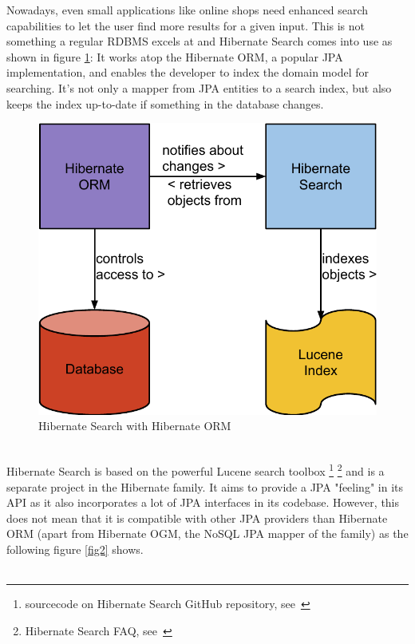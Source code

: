\pagebreak
\noindent
Nowadays, even small applications like online shops need enhanced search capabilities to let the user find more results for a given input.
This is not something a regular RDBMS excels at and Hibernate Search comes into use as shown in figure \ref{fig1}: It works atop the Hibernate ORM, a popular JPA implementation, and enables the developer to index the domain model for searching. It's not only a mapper from JPA entities to a search index, but also keeps the index up-to-date if something in the database changes.
\\
\begin{figure}[ht]
	\centering
	\includegraphics[scale=0.45]{images/hibernate_search_hibernate_schema.pdf}
	\caption{Hibernate Search with Hibernate ORM}
	\label{fig1}
\end{figure}
\\
Hibernate Search is based on the powerful Lucene search toolbox \footnote{sourcecode on Hibernate Search GitHub repository, see~\cite{hsearch_source_code_git}} \footnote{Hibernate Search FAQ, see~\cite{hibernate_search_faq}} and is a separate project in the Hibernate family. It aims to provide a JPA "feeling" in its API as it also incorporates a lot of JPA interfaces in its codebase. However, this does not mean that it is compatible with other JPA providers than Hibernate ORM (apart from Hibernate OGM, the NoSQL JPA mapper of the family) as the following figure \ref{fig2} shows.
\\\\
